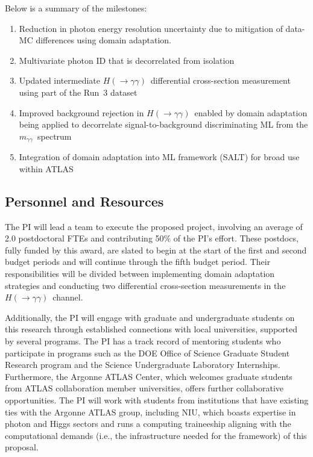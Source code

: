 \documentclass[letter, USenglish, 11pt, subfigure]{article}
\newcommand{\myy}{\ensuremath{m_{\gamma\gamma}}}
\newcommand{\hyy}{\ensuremath{H(\to\gamma\gamma)}}
\begin{document}
Below is a summary of the milestones:
\begin{enumerate}
\item Reduction in photon energy resolution uncertainty due to mitigation of data-MC differences using domain adaptation.
\item Multivariate photon ID that is decorrelated from isolation
\item Updated intermediate \hyy\ differential cross-section measurement using part of the Run~3 dataset
\item Improved background rejection in \hyy\ enabled by domain adaptation being applied to decorrelate signal-to-background discriminating ML from the \myy\ spectrum
\item Integration of domain adaptation into ML framework (SALT) for broad use within ATLAS
\end{enumerate}

\subsection{Personnel and Resources}
\label{sec:personnel}
The PI will lead a team to execute the proposed project, involving an average of 2.0 postdoctoral FTEs and contributing 50\% of the PI's effort. These postdocs, fully funded by this award, are slated to begin at the start of the first and second budget periods and will continue through the fifth budget period. Their responsibilities will be divided between implementing domain adaptation strategies and conducting two differential cross-section measurements in the \hyy\ channel.

Additionally, the PI will engage with graduate and undergraduate students on this research through established connections with local universities, supported by several programs. The PI has a track record of mentoring students who participate in programs such as the DOE Office of Science Graduate Student Research program and the Science Undergraduate Laboratory Internships. Furthermore, the Argonne ATLAS Center, which welcomes graduate students from ATLAS collaboration member universities, offers further collaborative opportunities. The PI will work with students from institutions that have existing ties with the Argonne ATLAS group, including NIU, which boasts expertise in photon and Higgs sectors and runs a computing traineeship aligning with the computational demands (i.e., the infrastructure needed for the framework) of this proposal.
\end{document}
